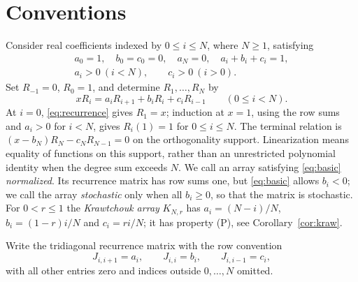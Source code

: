 \section{Conventions}\label{sec:criterion}
Consider real coefficients indexed by $0\leq i\leq N$, where $N\geq1$, satisfying
\begin{equation}\label{eq:basic}
\begin{gathered}
a_0=1,\quad b_0=c_0=0,\quad a_N=0,\quad a_i+b_i+c_i=1,\\
a_i>0\ (i<N),\qquad c_i>0\ (i>0).
\end{gathered}
\end{equation}
Set $R_{-1}=0$, $R_0=1$, and determine $R_1,\ldots,R_N$ by
\begin{equation}\label{eq:recurrence}
xR_i=a_iR_{i+1}+b_iR_i+c_iR_{i-1}\qquad(0\leq i<N).
\end{equation}
At $i=0$, \eqref{eq:recurrence} gives $R_1=x$; induction at $x=1$, using the row sums and $a_i>0$ for $i<N$, gives $R_i(1)=1$ for $0\leq i\leq N$.
The terminal relation is $(x-b_N)R_N-c_NR_{N-1}=0$ on the orthogonality support. Linearization means equality of functions on this support, rather than an unrestricted polynomial identity when the degree sum exceeds $N$. We call an array satisfying \eqref{eq:basic} \emph{normalized}. Its recurrence matrix has row sums one, but \eqref{eq:basic} allows $b_i<0$; we call the array \emph{stochastic} only when all $b_i\geq0$, so that the matrix is stochastic.
For $0<r\leq1$ the \emph{Krawtchouk array} $K_{N,r}$ has $a_i=(N-i)/N$, $b_i=(1-r)i/N$ and $c_i=ri/N$; it has property (P), see Corollary~\ref{cor:kraw}.

Write the tridiagonal recurrence matrix with the row convention
\[
J_{i,i+1}=a_i,\qquad J_{i,i}=b_i,\qquad J_{i,i-1}=c_i,
\]
with all other entries zero and indices outside $0,\ldots,N$ omitted.

